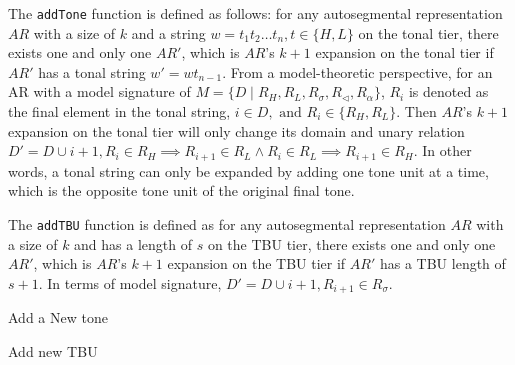 \documentclass[11pt,letterpaper]{article}
\begin{document}
The \verb*|addTone| function is defined as follows: for any autosegmental representation \(AR\) with a size of \(k\) and a string \(w = t_1t_2\ldots t_n, t \in \{H,L\}\) on the tonal tier, there exists one and only one \(AR'\), which is \(AR\)'s \(k+1\) expansion on the tonal tier if \(AR'\) has a tonal string \(w' = wt_{n-1}\). From a model-theoretic perspective, for an AR with a model signature of $M = \{D\mid R_H, R_L, R_\sigma, R_\lhd, R_\alpha\}$, \(R_i\) is denoted as the final element in the tonal string, \(i \in D,\text{ and }R_i \in \{R_H,R_L\}\). Then \(AR\)'s \(k+1\) expansion on the tonal tier will only change its domain and unary relation \(D' = D \cup i+1, R_i \in R_H \implies R_{i+1} \in R_L \wedge R_i \in R_L \implies R_{i+1} \in R_H\). In other words, a tonal string can only be expanded by adding one tone unit at a time, which is the opposite tone unit of the original final tone. 


The \verb*|addTBU| function is defined as for any autosegmental representation \(AR\) with a size of \(k\) and has a length of $s$ on the TBU tier, there exists one and only one \(AR'\), which is \(AR\)'s \(k+1\) expansion on the TBU tier if \(AR'\) has a TBU length of $s+1$. In terms of model signature, \(D' = D \cup i+1, R_{i+1} \in R_\sigma\).

\begin{multicols}{2}
	\ea  Add a New tone
	
	\z
	\ea  Add new TBU
	
	\z
\end{multicols}
\end{document}
